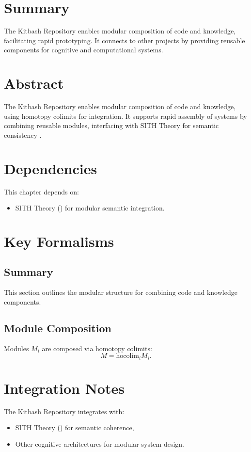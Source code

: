 \documentclass[11pt,oneside]{memoir}
\theoremstyle{plain}
\begin{document}
\section{Summary}
The Kitbash Repository enables modular composition of code and knowledge, facilitating rapid prototyping. It connects to other projects by providing reusable components for cognitive and computational systems.

\section{Abstract}
The Kitbash Repository enables modular composition of code and knowledge, using homotopy colimits for integration. It supports rapid assembly of systems by combining reusable modules, interfacing with SITH Theory for semantic consistency \cite{lurie}.

\section{Dependencies}
This chapter depends on:
\begin{itemize}
    \item SITH Theory () for modular semantic integration.
\end{itemize}

\section{Key Formalisms}
\subsection{Summary}
This section outlines the modular structure for combining code and knowledge components.

\subsection{Module Composition}
Modules \(M_i\) are composed via homotopy colimits:
\begin{equation}
    M = \text{hocolim}_i M_i.
\end{equation}

\section{Integration Notes}
The Kitbash Repository integrates with:
\begin{itemize}
    \item SITH Theory () for semantic coherence,
    \item Other cognitive architectures for modular system design.
\end{itemize}
\end{document}
